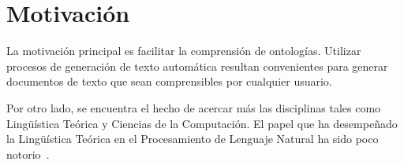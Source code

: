 \documentclass[11pt,a4paper,spanish]{book}
\begin{document}
\section{Motivación}
La motivación principal es facilitar la comprensión de ontologías. Utilizar procesos de generación de texto automática resultan convenientes para generar documentos de texto que sean comprensibles por cualquier usuario.

Por otro lado, se encuentra el hecho de acercar más las disciplinas tales como Lingüística Teórica y Ciencias de la Computación. El papel que ha desempeñado la Lingüística Teórica en el Procesamiento de Lenguaje Natural ha sido poco notorio~\cite{perinan2012defensa}.















\end{document}
